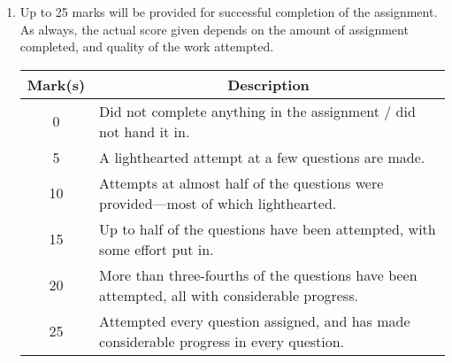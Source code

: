 \documentclass{amsart}
\theoremstyle{definition}
\theoremstyle{definition}
\DeclareMathOperator{\1}{\mathbbm{1}}
\begin{document}
	
	\begin{enumerate}[itemsep=.75em]
		
		
		\item Up to 25 marks will be provided for successful completion of the assignment. As always, the actual score given depends on the amount of assignment completed, and quality of the work attempted.
		
		\begin{center}
			\begin{tabular}{c | p{9cm}}
				\textbf{Mark(s)} & \multicolumn{1}{c}{\textbf{Description}} \\
				\hline
				0 & Did not complete anything in the assignment / did not hand it in. \\
				\hline
				5 & A lighthearted attempt at a few questions are made. \\
				\hline
				10 & Attempts at almost half of the questions were provided---most of which lighthearted. \\
				\hline
				15 & Up to half of the questions have been attempted, with some effort put in. \\
				\hline
				20 & More than three-fourths of the questions have been attempted, all with considerable progress. \\
				\hline
				25 & Attempted every question assigned, and has made considerable progress in every question.
			\end{tabular}
		\end{center}
	
		
		

\end{enumerate}
\end{document}
